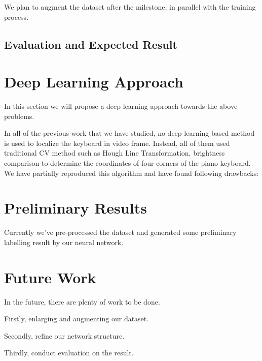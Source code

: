 \documentclass[10pt,twocolumn,letterpaper]{article}
\begin{document}
    We plan to augment the dataset after the milestone, in parallel with the training process.

    \subsection{Evaluation and Expected Result}

\section{Deep Learning Approach}
In this section we will propose a deep learning approach towards the above problems.

In all of the previous work that we have studied, no deep learning based method is used to localize the keyboard in video frame. 
Instead, all of them used traditional CV method such as Hough Line Transformation, brightness comparison to determine the coordinates of four corners of the piano keyboard. 
We have partially reproduced this algorithm and have found following drawbacks:

\section{Preliminary Results}
Currently we've pre-processed the dataset and generated some preliminary labelling result by our neural network.

\section{Future Work}
In the future, there are plenty of work to be done.

Firstly, enlarging and augmenting our dataset.

Secondly, refine our network structure.

Thirdly, conduct evaluation on the result.

{\small


}
\end{document}
